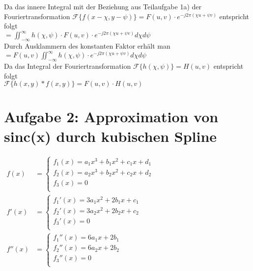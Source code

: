 \documentclass[a4paper,11pt,oneside]{scrartcl}
\begin{document}
Da das innere Integral mit der Beziehung aus Teilaufgabe 1a) der Fouriertransformation $\mathcal{F}\{f(x-\chi,y-\psi)\}=F(u,v)\cdot e^{-j2\pi(\chi u+\psi v)}$ entspricht folgt \\

$=\iint_{-\infty}^{\infty}h(\chi,\psi)\cdot F(u,v)\cdot e^{-j2\pi(\chi u+\psi v)} d\chi d\psi$ \\

Durch Ausklammern des konstanten Faktor erhält man \\

$=F(u,v)\iint_{-\infty}^{\infty}h(\chi,\psi)\cdot e^{-j2\pi(\chi u+\psi v)} d\chi d\psi$ \\

Da das Integral der Fouriertransformation $\mathcal{F}\{h(\chi,\psi)\}=H(u,v)$ entspricht folgt \\

$\mathcal{F}\{h(x,y)\ast f(x,y)\}=F(u,v)\cdot H(u,v)$

\newpage

\section*{Aufgabe 2: Approximation von sinc(x) durch kubischen Spline}

\begin{math}
\begin{array}{ll}
f(x) & = 
 \left\{ 
  \begin{array}{l}
   f_1(x) = a_1x^3 + b_1x^2 + c_1x + d_1\\
   f_2(x) = a_2x^3 + b_2x^2 + c_2x + d_2\\
   f_3(x) = 0\\
  \end{array} 
 \right.
\\[0.5cm]
f'(x) & = 
 \left\{ 
  \begin{array}{l}
   f_1'(x) = 3a_1x^2 + 2b_1x + c_1 \\
   f_2'(x) = 3a_2x^2 + 2b_2x + c_2 \\
   f_3'(x) = 0\\
  \end{array} 
 \right.
\\[0.5cm]
f''(x) & = 
 \left\{
  \begin{array}{l}
   f_1''(x) = 6a_1x + 2b_1\\
   f_2''(x) = 6a_2x + 2b_2\\
   f_3''(x) = 0\\
  \end{array}
 \right.
 \end{array}
\end{math}
\end{document}
